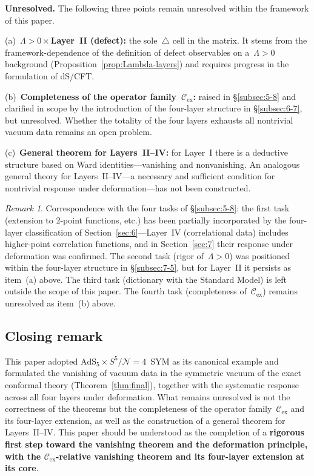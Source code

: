 \documentclass[
  aps,
  prd,
  preprint,
  groupedaddress,
  nofootinbib,
  longbibliography
]{revtex4-2}
\theoremstyle{remark}
\newtheorem{remark}[definition]{Remark}
\newcommand{\Cex}{\mathcal{C}_{\mathrm{ex}}}
\newcommand{\N}{\mathcal{N}}
\newcommand{\AdS}{\mathrm{AdS}}
\begin{document}
\textbf{Unresolved.}
The following three points remain unresolved within the framework
of this paper.

(a)~\textbf{$\Lambda>0\times$Layer~II (defect):}
the sole~$\triangle$ cell in the matrix.
It stems from the framework-dependence of the definition of
defect observables on a~$\Lambda>0$
background (Proposition~\ref{prop:Lambda-layers}) and
requires progress in the formulation of dS/CFT\@.

(b)~\textbf{Completeness of the operator family~$\Cex$:}
raised in \S\ref{subsec:5-8} and clarified in scope by the
introduction of the four-layer structure in \S\ref{subsec:6-7},
but unresolved.
Whether the totality of the four layers exhausts all nontrivial
vacuum data remains an open problem.

(c)~\textbf{General theorem for Layers~II--IV:}
for Layer~I there is a deductive structure based on Ward
identities---vanishing and nonvanishing.
An analogous general theory for Layers~II--IV---a necessary
and sufficient condition for nontrivial response under
deformation---has not been constructed.

\begin{remark}\label{rem:scope-update}
Correspondence with the four tasks of \S\ref{subsec:5-8}:
the first task (extension to 2-point functions, etc.) has been
partially incorporated by the four-layer classification of
Section~\ref{sec:6}---Layer~IV (correlational data) includes
higher-point correlation functions, and in Section~\ref{sec:7}
their response under deformation was confirmed.
The second task (rigor of~$\Lambda>0$) was positioned within
the four-layer structure in \S\ref{subsec:7-5}, but for
Layer~II it persists as item~(a) above.
The third task (dictionary with the Standard Model) is left
outside the scope of this paper.
The fourth task (completeness of~$\Cex$) remains unresolved
as item~(b) above.
\end{remark}

\subsection{Closing remark}\label{subsec:8-5}

This paper adopted $\AdS_5\times S^5/\N=4$~SYM as its canonical
example and formulated the vanishing of vacuum data in the
symmetric vacuum of the exact conformal theory
(Theorem~\ref{thm:final}), together with the
systematic response across all four layers under deformation.
What remains unresolved is not the correctness of the theorems
but the completeness of the operator family~$\Cex$ and its
four-layer extension, as well as the construction of a general
theorem for Layers~II--IV\@.
This paper should be understood as the completion of a
\textbf{rigorous first step toward the vanishing theorem and
the deformation principle, with the $\Cex$-relative vanishing
theorem and its four-layer extension at its core}.
\end{document}
